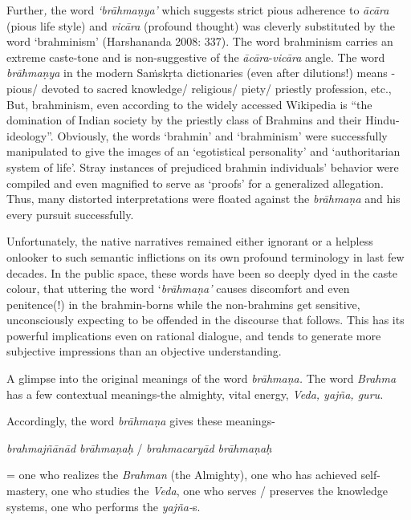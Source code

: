 Further\textit{,} the word\textit{ ‘brāhmaṇya’} which suggests strict pious adherence to \textit{ācāra} (pious life style) and \textit{vicāra} (profound thought) was cleverly substituted by the word ‘brahminism’ (Harshananda 2008: 337). The word brahminism carries an extreme caste-tone and is non-suggestive of the \textit{ācāra}-\textit{vicāra} angle. The word \textit{brāhmaṇya} in the modern Saṁskṛta dictionaries (even after dilutions!) means - pious/ devoted to sacred knowledge/ religious/ piety/ priestly profession, etc., But, brahminism, even according to the widely accessed Wikipedia is “the domination of Indian society by the priestly class of Brahmins and their Hindu-ideology”. Obviously, the words ‘brahmin’ and ‘brahminism’ were successfully manipulated to give the images of an ‘egotistical personality’ and ‘authoritarian system of life’. Stray instances of prejudiced brahmin individuals’ behavior were compiled and even magnified to serve as ‘proofs’ for a generalized allegation. Thus, many distorted interpretations were floated against the \textit{brāhmaṇa} and his every pursuit successfully.

Unfortunately, the native narratives remained either ignorant or a helpless onlooker to such semantic inflictions on its own profound terminology in last few decades. In the public space, these words have been so deeply dyed in the caste colour, that uttering the word ‘\textit{brāhmaṇa’} causes discomfort and even penitence(!) in the brahmin-borns while the non-brahmins get sensitive, unconsciously expecting to be offended in the discourse that follows. This has its powerful implications even on rational dialogue, and tends to generate more subjective impressions than an objective understanding.

A glimpse into the original meanings of the word \textit{brāhmaṇa.} The word \textit{Brahma} has a few contextual meanings-the almighty, vital energy, \textit{Veda, yajña, guru.}

Accordingly, the word \textit{brāhmaṇa} gives these meanings-

\textit{brahmajñānād brāhmaṇaḥ} / \textit{brahmacaryād brāhmaṇaḥ}

= one who realizes the \textit{Brahman} (the Almighty), one who has achieved self-mastery, one who studies the \textit{Veda}, one who serves / preserves the knowledge systems, one who performs the \textit{yajña-}s.

